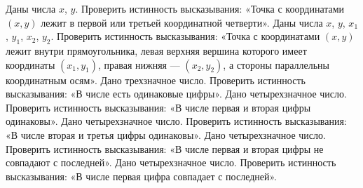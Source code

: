 Даны числа $x$, $y$. Проверить истинность высказывания: «Точка с координатами $(x, y)$ лежит в первой или третьей координатной четверти».
Даны числа $x$, $y$, $x_1$, $y_1$, $x_2$, $y_2$. Проверить истинность высказывания: «Точка с координатами $(x, y)$ лежит внутри прямоугольника, левая верхняя вершина которого имеет координаты $(x_1, y_1)$, правая нижняя --- $(x_2, y_2)$, а стороны параллельны координатным осям».
Дано трехзначное число. Проверить истинность высказывания: «В числе есть одинаковые цифры».
Дано четырехзначное число. Проверить истинность высказывания: «В числе первая и вторая цифры одинаковы».
Дано четырехзначное число. Проверить истинность высказывания: «В числе вторая и третья цифры одинаковы».
Дано четырехзначное число. Проверить истинность высказывания: «В числе первая и вторая цифры не совпадают с последней».
Дано четырехзначное число. Проверить истинность высказывания: «В числе первая цифра совпадает с последней».
